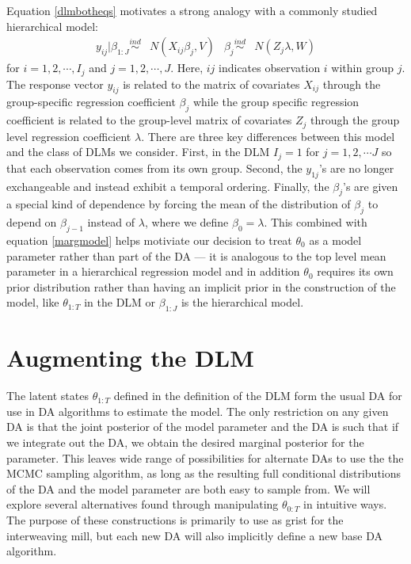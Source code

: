 \documentclass{article}
\begin{document}
Equation \eqref{dlmbotheqs} motivates a strong analogy with a commonly studied hierarchical model:
\begin{align*}
  y_{ij}|\beta_{1:J} \stackrel{ind}{\sim} & N(X_{ij}\beta_j,V) &
  \beta_j \stackrel{ind}{\sim} & N(Z_j\lambda,W)
\end{align*}
for $i=1,2,\cdots,I_j$ and $j=1,2,\cdots,J$. Here, $ij$ indicates observation $i$ within group $j$. The response vector $y_{ij}$ is related to the matrix of covariates $X_{ij}$ through the group-specific regression coefficient $\beta_j$ while the group specific regression coefficient is related to the group-level matrix of covariates $Z_j$ through the group level regression coefficient $\lambda$. There are three key differences between this model and the class of DLMs we consider. First, in the DLM $I_j=1$ for $j=1,2,\cdots J$ so that each observation comes from its own group. Second, the $y_{1j}$'s are no longer exchangeable and instead exhibit a temporal ordering. Finally, the $\beta_j$'s are given a special kind of dependence by forcing the mean of the distribution of $\beta_j$ to depend on $\beta_{j-1}$ instead of $\lambda$, where we define $\beta_0=\lambda$. This combined with equation \eqref{margmodel} helps motiviate our decision to treat $\theta_0$ as a model parameter rather than part of the DA --- it is analogous to the top level mean parameter in a hierarchical regression model and in addition $\theta_0$ requires its own prior distribution rather than having an implicit prior in the construction of the model, like $\theta_{1:T}$ in the DLM or $\beta_{1:J}$ is the hierarchical model.

\section{Augmenting the DLM}\label{sec:DAs}
The latent states $\theta_{1:T}$ defined in the definition of the DLM form the usual DA for use in DA algorithms to estimate the model. The only restriction on any given DA is that the joint posterior of the model parameter and the DA is such that if we integrate out the DA, we obtain the desired marginal posterior for the parameter. This leaves wide range of possibilities for alternate DAs to use the the MCMC sampling algorithm, as long as the resulting full conditional distributions of the DA and the model parameter are both easy to sample from. We will explore several alternatives found through manipulating $\theta_{0:T}$ in intuitive ways. The purpose of these constructions is primarily to use as grist for the interweaving mill, but each new DA will also implicitly define a new base DA algorithm.
\end{document}
